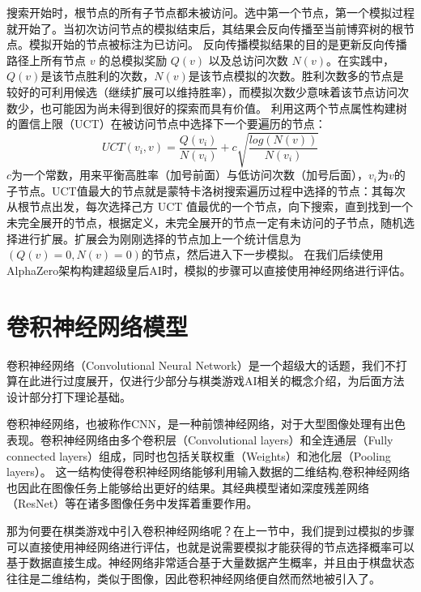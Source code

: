 搜索开始时，根节点的所有子节点都未被访问。选中第一个节点，第一个模拟过程就开始了。当初次访问节点的模拟结束后，其结果会反向传播至当前博弈树的根节点。模拟开始的节点被标注为已访问。
反向传播模拟结果的目的是更新反向传播路径上所有节点 $v$ 的总模拟奖励 $Q(v)$ 以及总访问次数 $N(v)$。在实践中，$Q(v)$是该节点胜利的次数，$N(v)$是该节点模拟的次数。胜利次数多的节点是较好的可利用候选（继续扩展可以维持胜率），而模拟次数少意味着该节点访问次数少，也可能因为尚未得到很好的探索而具有价值。
利用这两个节点属性构建树的置信上限（UCT）\cite{10.1007/11871842_29}在被访问节点中选择下一个要遍历的节点：
\begin{equation}
    UCT(v_{i},v) = \frac{Q(v_{i})}{N(v_{i})} + c\sqrt{\frac{log(N(v))}{N(v_{i})}}
\end{equation}
$c$为一个常数，用来平衡高胜率（加号前面）与低访问次数（加号后面），$v_{i}$为$v$的子节点。UCT值最大的节点就是蒙特卡洛树搜索遍历过程中选择的节点：其每次从根节点出发，每次选择己方 UCT 值最优的一个节点，向下搜索，直到找到一个未完全展开的节点，根据定义，未完全展开的节点一定有未访问的子节点，随机选择进行扩展。扩展会为刚刚选择的节点加上一个统计信息为$(Q(v)=0,N(v)=0)$的节点，然后进入下一步模拟。
在我们后续使用AlphaZero架构构建超级皇后AI时，模拟的步骤可以直接使用神经网络进行评估\cite{Silver1140,Silver2017,Silver2016}。

\section{卷积神经网络模型}
卷积神经网络（Convolutional Neural Network）是一个超级大的话题，我们不打算在此进行过度展开，仅进行少部分与棋类游戏AI相关的概念介绍，为后面方法设计部分打下理论基础。

卷积神经网络，也被称作CNN，是一种前馈神经网络\cite{SCHMIDHUBER201585}，对于大型图像处理有出色表现\cite{NIPS2012_4824}。卷积神经网络由多个卷积层（Convolutional layers）和全连通层（Fully connected layers）组成，同时也包括关联权重（Weights）和池化层（Pooling layers）\cite{venkatesan2017convolutional}。
这一结构使得卷积神经网络能够利用输入数据的二维结构,卷积神经网络也因此在图像任务上能够给出更好的结果\cite{VALUEVA2020232}。其经典模型诸如深度残差网络（ResNet）\cite{resnet}等在诸多图像任务中发挥着重要作用。

那为何要在棋类游戏中引入卷积神经网络呢？在上一节中，我们提到过模拟的步骤可以直接使用神经网络进行评估，也就是说需要模拟才能获得的节点选择概率可以基于数据直接生成。神经网络非常适合基于大量数据产生概率，并且由于棋盘状态往往是二维结构，类似于图像，因此卷积神经网络便自然而然地被引入了\cite{Silver1140,Silver2017,Silver2016}。

